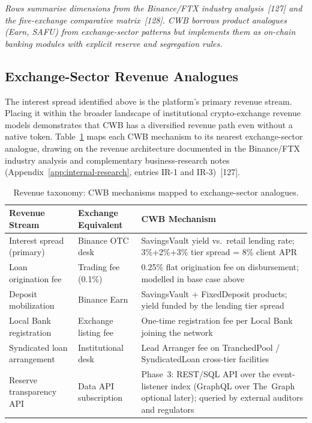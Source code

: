 \documentclass[12pt,a4paper]{report}
\newcommand{\tableheadcolor}{\rowcolor{TableHeadBg}}
\begin{document}
\vspace{2pt}
\noindent\textit{\small Rows summarise dimensions from the Binance/FTX industry analysis~[127] and the five-exchange comparative matrix~[128]. CWB borrows \textit{product analogues} (Earn, SAFU) from exchange-sector patterns but implements them as on-chain banking modules with explicit reserve and segregation rules.}

\subsection{Exchange-Sector Revenue Analogues}
\label{sec:revenue-analogues}

\noindent The interest spread identified above is the platform's primary revenue stream. Placing it within the broader landscape of institutional crypto-exchange revenue models demonstrates that CWB has a diversified revenue path even without a native token. Table~\ref{tab:revenue-taxonomy} maps each CWB mechanism to its nearest exchange-sector analogue, drawing on the revenue architecture documented in the Binance/FTX industry analysis and complementary business-research notes (Appendix~\ref{app:internal-research}, entries IR-1 and IR-3)~[127].

\begin{table}[H]
\centering
\caption[Revenue taxonomy vs.\ exchange analogues]{Revenue taxonomy: CWB mechanisms mapped to exchange-sector analogues.}
\label{tab:revenue-taxonomy}
\begin{tabular}{p{3.8cm}p{3.8cm}p{5.6cm}}
\toprule
\tableheadcolor
\textbf{Revenue Stream} & \textbf{Exchange Equivalent} & \textbf{CWB Mechanism} \\
\midrule
Interest spread (primary) & Binance OTC desk & SavingsVault yield vs.\ retail lending rate; 3\%+2\%+3\% tier spread = 8\% client APR \\
Loan origination fee & Trading fee (0.1\%) & 0.25\% flat origination fee on disbursement; modelled in base case above \\
Deposit mobilization & Binance Earn & SavingsVault + FixedDeposit products; yield funded by the lending tier spread \\
Local Bank registration & Exchange listing fee & One-time registration fee per Local Bank joining the network \\
Syndicated loan arrangement & Institutional desk & Lead Arranger fee on TranchedPool / SyndicatedLoan cross-tier facilities \\
Reserve transparency API & Data API subscription & Phase~3: REST/SQL API over the event-listener index (GraphQL over The~Graph optional later); queried by external auditors and regulators \\
\bottomrule
\end{tabular}
\end{table}
\end{document}
